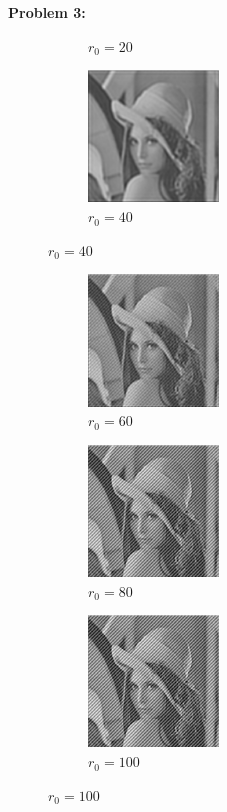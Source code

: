 \documentclass[11pt]{article}
\newenvironment{problem}[1]{\textbf{Problem #1: }}{\newpage}
\begin{document}
\begin{problem}{3}
\begin{enumerate}[label = (\alph*)]
\begin{figure}[h!]
\begin{subfigure}{.3 \textwidth}
					\caption{$r_0 = 20$}
				\end{subfigure}
				\begin{subfigure}{.3 \textwidth}
					\centering
					\includegraphics[height = 3.5cm]{Figures/Prob3/r040}
					\caption{$r_0 = 40$}
				\end{subfigure}
			\end{figure}
			\begin{figure}[h!]
				\centering
				\begin{subfigure}{.3 \textwidth}
					\centering
					\includegraphics[height = 3.5cm]{Figures/Prob3/r060}
					\caption{$r_0 = 60$}
				\end{subfigure}
				\begin{subfigure}{.3 \textwidth}
					\centering
					\includegraphics[height = 3.5cm]{Figures/Prob3/r080}
					\caption{$r_0 = 80$}
				\end{subfigure}
				\begin{subfigure}{.3 \textwidth}
					\centering
					\includegraphics[height = 3.5cm]{Figures/Prob3/r0100}
					\caption{$r_0 = 100$}

\end{subfigure}
\end{figure}
\end{enumerate}
\end{problem}
\end{document}
